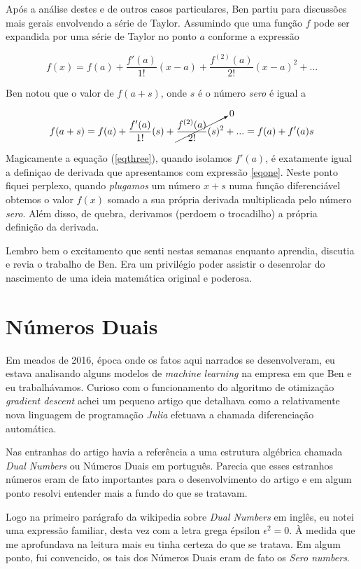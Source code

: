 \documentclass{article}
\begin{document}
Após a análise destes e de outros casos particulares, Ben partiu para discussões mais gerais envolvendo a série de Taylor. Assumindo que uma função \(f\) pode ser expandida por uma série de Taylor no ponto \(a\) conforme a expressão

\[
f(x) =  f(a) + \frac{f'(a)}{1!}(x-a)+ \frac{f^{(2)}(a)}{2!}(x-a)^{2}
 + ... 
\]

Ben notou que o valor de \(f(a+s)\), onde \(s\) é o número \textit{sero} é igual a

\begin{equation} \label{eqthree} 
f(a+s) =  f(a) + \frac{f'(a)}{1!}(s)+
\cancelto{0}{\frac{f^{(2)}(a)}{2!}(s)^{2}} + ... 
= f(a) + f'(a)s
\end{equation}


Magicamente a equação (\ref{eqthree}), quando isolamos \(f'(a)\), é exatamente igual a definiçao de derivada que apresentamos com expressão \ref{eqone}. Neste ponto fiquei perplexo, quando \textit{plugamos} um número \(x + s\) numa função diferenciável obtemos o valor \(f(x)\) somado a sua própria derivada multiplicada pelo número \textit{sero}. Além disso, de quebra, derivamos (perdoem o trocadilho) a própria definição da derivada.

Lembro bem o excitamento que senti nestas semanas enquanto aprendia, discutia e revia o trabalho de Ben. Era um privilégio poder assistir o desenrolar do nascimento de uma ideia matemática original e poderosa.

\section*{Números Duais}

Em meados de 2016, época onde os fatos aqui narrados se desenvolveram, eu estava analisando alguns modelos de \textit{machine learning} na empresa em que Ben e eu trabalhávamos. Curioso com o funcionamento do algoritmo de otimização \textit{gradient descent} achei um pequeno artigo que detalhava como a relativamente nova linguagem de programação \textit{Julia} efetuava a chamada diferenciação automática. 

Nas entranhas do artigo havia a referência a uma estrutura algébrica chamada \textit{Dual Numbers} ou Números Duais em português. Parecia que esses estranhos números eram de fato importantes para o desenvolvimento do artigo e em algum ponto resolvi entender mais a fundo do que se tratavam.

Logo na primeiro parágrafo da wikipedia sobre \textit{Dual Numbers} em inglês, eu notei uma expressão familiar, desta vez com a letra grega épsilon \( \epsilon^2 = 0 \). À medida que me aprofundava na leitura mais eu tinha certeza do que se tratava. Em algum ponto, fui convencido, os tais dos Números Duais eram de fato os \textit{Sero numbers}.
\end{document}
